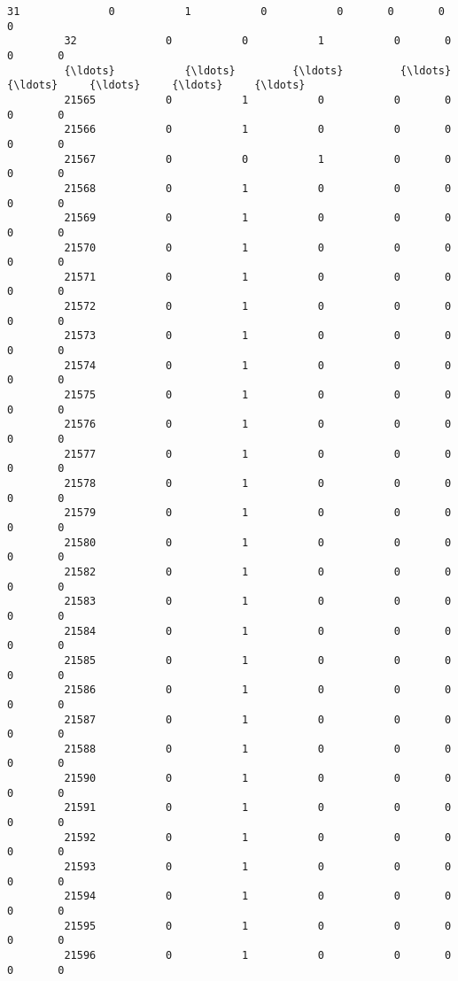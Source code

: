 \documentclass[11pt]{article}
\begin{document}
\begin{Verbatim}[commandchars=\\\{\}]
         31              0           1           0           0       0       0       0   
         32              0           0           1           0       0       0       0   
         {\ldots}           {\ldots}         {\ldots}         {\ldots}         {\ldots}     {\ldots}     {\ldots}     {\ldots}   
         21565           0           1           0           0       0       0       0   
         21566           0           1           0           0       0       0       0   
         21567           0           0           1           0       0       0       0   
         21568           0           1           0           0       0       0       0   
         21569           0           1           0           0       0       0       0   
         21570           0           1           0           0       0       0       0   
         21571           0           1           0           0       0       0       0   
         21572           0           1           0           0       0       0       0   
         21573           0           1           0           0       0       0       0   
         21574           0           1           0           0       0       0       0   
         21575           0           1           0           0       0       0       0   
         21576           0           1           0           0       0       0       0   
         21577           0           1           0           0       0       0       0   
         21578           0           1           0           0       0       0       0   
         21579           0           1           0           0       0       0       0   
         21580           0           1           0           0       0       0       0   
         21582           0           1           0           0       0       0       0   
         21583           0           1           0           0       0       0       0   
         21584           0           1           0           0       0       0       0   
         21585           0           1           0           0       0       0       0   
         21586           0           1           0           0       0       0       0   
         21587           0           1           0           0       0       0       0   
         21588           0           1           0           0       0       0       0   
         21590           0           1           0           0       0       0       0   
         21591           0           1           0           0       0       0       0   
         21592           0           1           0           0       0       0       0   
         21593           0           1           0           0       0       0       0   
         21594           0           1           0           0       0       0       0   
         21595           0           1           0           0       0       0       0   
         21596           0           1           0           0       0       0       0   
         

\end{Verbatim}
\end{document}

